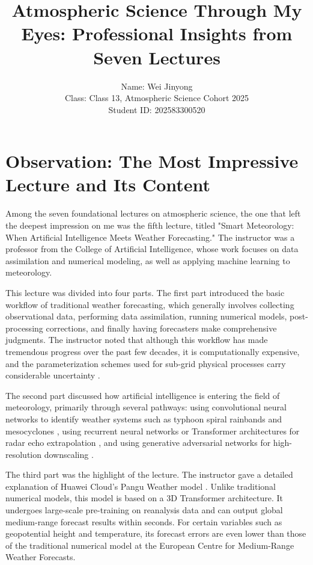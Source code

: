\documentclass{article}
\begin{document}
\title{Atmospheric Science Through My Eyes: Professional Insights from Seven Lectures}
\author{Name: Wei Jinyong\\Class: Class 13, Atmospheric Science Cohort 2025\\Student ID: 202583300520}
\date{}
\maketitle

\section{Observation: The Most Impressive Lecture and Its Content}

Among the seven foundational lectures on atmospheric science, the one that left the deepest impression on me was the fifth lecture, titled "Smart Meteorology: When Artificial Intelligence Meets Weather Forecasting." The instructor was a professor from the College of Artificial Intelligence, whose work focuses on data assimilation and numerical modeling, as well as applying machine learning to meteorology.

This lecture was divided into four parts. The first part introduced the basic workflow of traditional weather forecasting, which generally involves collecting observational data, performing data assimilation, running numerical models, post-processing corrections, and finally having forecasters make comprehensive judgments. The instructor noted that although this workflow has made tremendous progress over the past few decades, it is computationally expensive, and the parameterization schemes used for sub-grid physical processes carry considerable uncertainty \cite{Chen2004Numerical}.

The second part discussed how artificial intelligence is entering the field of meteorology, primarily through several pathways: using convolutional neural networks to identify weather systems such as typhoon spiral rainbands and mesocyclones \cite{Lecun2015Deep}, using recurrent neural networks or Transformer architectures for radar echo extrapolation \cite{Shi2015Convolutional}, and using generative adversarial networks for high-resolution downscaling \cite{Reichstein2019Deep}.

The third part was the highlight of the lecture. The instructor gave a detailed explanation of Huawei Cloud's Pangu Weather model \cite{Bi2022}. Unlike traditional numerical models, this model is based on a 3D Transformer architecture. It undergoes large-scale pre-training on reanalysis data and can output global medium-range forecast results within seconds. For certain variables such as geopotential height and temperature, its forecast errors are even lower than those of the traditional numerical model at the European Centre for Medium-Range Weather Forecasts.
\end{document}
